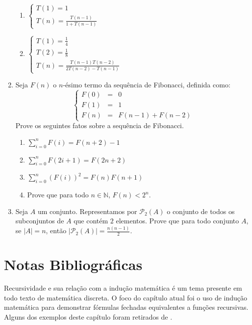 \begin{enumerate}
\begin{enumerate}
		\item
				$\left\{
					\begin{array}{l}
						T(1) = 1 \\
						T(n) = \frac{T(n-1)}{1 + T(n - 1)}
					\end{array}
			    \right .$
               \item
                            $\left\{
					\begin{array}{l}
						T(1) = \frac{1}{4} \\
						T(2) = \frac{1}{8}\\
                                                T(n) =
                                                \frac{T(n-1)T(n-2)}{2T(n-2)
                                                - T(n-1)}
					\end{array}
			    \right .$
	\end{enumerate}
	\item Seja $F(n)$ o $n$-\'esimo termo da sequ\^encia de Fibonacci, definida como:
	\[
		\left\{
			\begin{array}{lcl}
				F(0) & = & 0\\
				F(1) & = & 1 \\
				F(n) & = & F(n - 1) + F(n - 2)
			\end{array}
		\right.
	\]
	Prove os seguintes fatos sobre a sequ\^encia de Fibonacci.
	\begin{enumerate}
		\item $\sum_{i=0}^{n}F(i) = F(n + 2) - 1$
		\item $\sum_{i=0}^{n}F(2i + 1) = F(2n + 2)$
		\item $\sum_{i=0}^{n}(F(i))^{2} = F(n)F(n+1)$
		\item Prove que para todo $n\in\mathbb{N}$, $F(n) < 2^n$.
	\end{enumerate}
        \item Seja $A$ um conjunto. Representamos por
          $\mathcal{P}_{2}(A)$ o conjunto de todos os subconjuntos de
          $A$ que contém $2$ elementos. Prove que para todo conjunto
          $A$, se $|A| = n$, então $|\mathcal{P}_{2}(A)| = \frac{n (n - 1)}{2}$.
\end{enumerate}

\section{Notas Bibliográficas}

Recursividade e sua relação com a indução matemática é um tema
presente em todo texto de matemática discreta. O foco do capítulo
atual foi o uso de indução matemática para demonstrar fórmulas
fechadas equivalentes a funções recursivas. Alguns dos exemplos deste
capítulo foram retirados de \cite{Graham94}.
